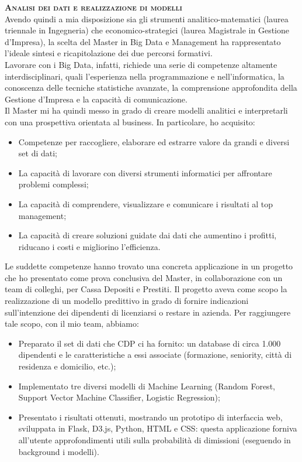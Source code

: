 \is
\textbf{\textsc{Analisi dei dati e realizzazione di modelli}} \\
Avendo quindi a mia disposizione sia gli strumenti analitico-matematici (laurea triennale in Ingegneria) che economico-strategici (laurea Magistrale in Gestione d’Impresa), la scelta del Master in Big Data e Management ha rappresentato l’ideale sintesi e ricapitolazione dei due percorsi formativi. \\
Lavorare con i Big Data, infatti, richiede una serie di competenze altamente interdisciplinari, quali l’esperienza nella programmazione e nell'informatica, la conoscenza delle tecniche statistiche avanzate, la comprensione approfondita della Gestione d’Impresa e la capacità di comunicazione. \\
Il Master mi ha quindi messo in grado di creare modelli analitici e interpretarli con una prospettiva orientata al business. In particolare, ho acquisito:
\begin{itemize}
	\item Competenze per raccogliere, elaborare ed estrarre valore da grandi e diversi set di dati;
	\item La capacità di lavorare con diversi strumenti informatici per affrontare problemi complessi;
	\item La capacità di comprendere, visualizzare e comunicare i risultati al top management;
	\item La capacità di creare soluzioni guidate dai dati che aumentino i profitti, riducano i costi e migliorino l'efficienza.
\end{itemize}
Le suddette competenze hanno trovato una concreta applicazione in un progetto che ho presentato come prova conclusiva del Master, in collaborazione con un team di colleghi, per Cassa Depositi e Prestiti. Il progetto aveva come scopo la realizzazione di un modello predittivo in grado di fornire indicazioni sull’intenzione dei dipendenti di licenziarsi o restare in azienda.
Per raggiungere tale scopo, con il mio team, abbiamo:
\begin{itemize}
	\item Preparato il set di dati che CDP ci ha fornito: un database di circa 1.000 dipendenti e le caratteristiche a essi associate (formazione, seniority, città di residenza e domicilio, etc.);
	\item Implementato tre diversi modelli di Machine Learning (Random Forest, Support Vector Machine Classifier, Logistic Regression);
	\item Presentato i risultati ottenuti, mostrando un prototipo di interfaccia web, sviluppata in Flask, D3.js, Python, HTML e CSS: questa applicazione forniva all'utente approfondimenti utili sulla probabilità di dimissioni (eseguendo in background i modelli).
\end{itemize}


